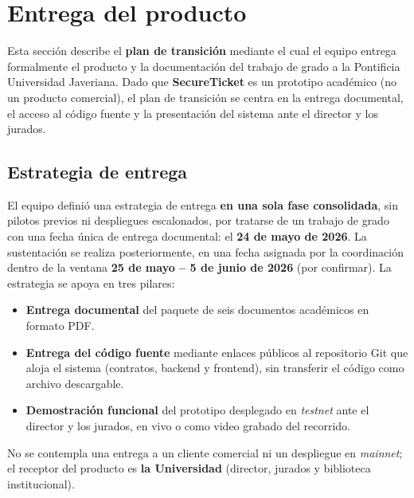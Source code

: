 \documentclass[12pt,oneside]{report}
\newcommand{\projectname}{SecureTicket}
\begin{document}
  \section{Entrega del producto}
  \label{sec:entrega-producto}

    Esta sección describe el \textbf{plan de transición} mediante el cual el equipo entrega formalmente el producto y la documentación del trabajo de grado a la Pontificia Universidad Javeriana. Dado que \textbf{\projectname} es un prototipo académico (no un producto comercial), el plan de transición se centra en la entrega documental, el acceso al código fuente y la presentación del sistema ante el director y los jurados.

    \subsection{Estrategia de entrega}
    \label{subsec:estrategia-entrega}

      El equipo definió una estrategia de entrega \textbf{en una sola fase consolidada}, sin pilotos previos ni despliegues escalonados, por tratarse de un trabajo de grado con una fecha única de entrega documental: el \textbf{24 de mayo de 2026}. La sustentación se realiza posteriormente, en una fecha asignada por la coordinación dentro de la ventana \textbf{25 de mayo -- 5 de junio de 2026} (por confirmar). La estrategia se apoya en tres pilares:
      \begin{itemize}
        \item \textbf{Entrega documental} del paquete de seis documentos académicos en formato PDF.
        \item \textbf{Entrega del código fuente} mediante enlaces públicos al repositorio Git que aloja el sistema (contratos, backend y frontend), sin transferir el código como archivo descargable.
        \item \textbf{Demostración funcional} del prototipo desplegado en \textit{testnet} ante el director y los jurados, en vivo o como video grabado del recorrido.
      \end{itemize}

      No se contempla una entrega a un cliente comercial ni un despliegue en \textit{mainnet}; el receptor del producto es \textbf{la Universidad} (director, jurados y biblioteca institucional).
\end{document}
